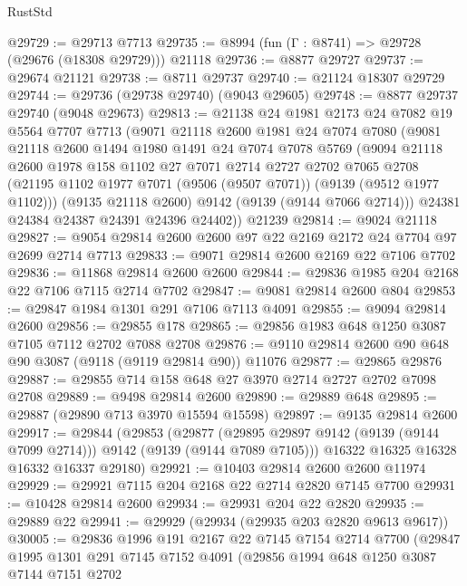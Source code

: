 \begin{lexlean}{RustStd}
\begin{coremodule}
@29729 := @29713 @7713
@29735 := @8994 (fun (Γ : @8741) => @29728 (@29676 (@18308 @29729))) @21118
@29736 := @8877 @29727
@29737 := @29674 @21121
@29738 := @8711 @29737
@29740 := @21124 @18307 @29729
@29744 := @29736 (@29738 @29740) (@9043 @29605)
@29748 := @8877 @29737 @29740 (@9048 @29673)
@29813 := @21138
    @24
    @1981
    @2173
    @24
    @7082
    @19
    @5564
    @7707
    @7713
    (@9071
      @21118
      @2600
      @1981
      @24
      @7074
      @7080
      (@9081
        @21118
        @2600
        @1494
        @1980
        @1491
        @24
        @7074
        @7078
        @5769
        (@9094
          @21118
          @2600
          @1978
          @158
          @1102
          @27
          @7071
          @2714
          @2727
          @2702
          @7065
          @2708
          (@21195 @1102 @1977 @7071 (@9506 (@9507 @7071)) (@9139 (@9512 @1977 @1102)))
          (@9135 @21118 @2600)
          @9142
          (@9139 (@9144 @7066 @2714)))
        @24381
        @24384
        @24387
        @24391
        @24396
        @24402))
    @21239
@29814 := @9024 @21118
@29827 := @9054 @29814 @2600 @2600 @97 @22 @2169 @2172 @24 @7704 @97 @2699 @2714 @7713
@29833 := @9071 @29814 @2600 @2169 @22 @7106 @7702
@29836 := @11868 @29814 @2600 @2600
@29844 := @29836 @1985 @204 @2168 @22 @7106 @7115 @2714 @7702
@29847 := @9081 @29814 @2600 @804
@29853 := @29847 @1984 @1301 @291 @7106 @7113 @4091
@29855 := @9094 @29814 @2600
@29856 := @29855 @178
@29865 := @29856 @1983 @648 @1250 @3087 @7105 @7112 @2702 @7088 @2708
@29876 := @9110 @29814 @2600 @90 @648 @90 @3087 (@9118 (@9119 @29814 @90)) @11076
@29877 := @29865 @29876
@29887 := @29855 @714 @158 @648 @27 @3970 @2714 @2727 @2702 @7098 @2708
@29889 := @9498 @29814 @2600
@29890 := @29889 @648
@29895 := @29887 (@29890 @713 @3970 @15594 @15598)
@29897 := @9135 @29814 @2600
@29917 := @29844
    (@29853
      (@29877 (@29895 @29897 @9142 (@9139 (@9144 @7099 @2714))) @9142 (@9139 (@9144 @7089 @7105)))
      @16322
      @16325
      @16328
      @16332
      @16337
      @29180)
@29921 := @10403 @29814 @2600 @2600 @11974
@29929 := @29921 @7115 @204 @2168 @22 @2714 @2820 @7145 @7700
@29931 := @10428 @29814 @2600
@29934 := @29931 @204 @22 @2820
@29935 := @29889 @22
@29941 := @29929 (@29934 (@29935 @203 @2820 @9613 @9617))
@30005 := @29836
    @1996
    @191
    @2167
    @22
    @7145
    @7154
    @2714
    @7700
    (@29847
      @1995
      @1301
      @291
      @7145
      @7152
      @4091
      (@29856
        @1994
        @648
        @1250
        @3087
        @7144
        @7151
        @2702

\end{coremodule}
\end{lexlean}
